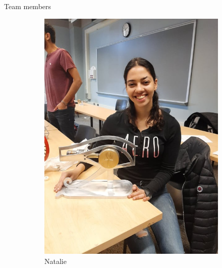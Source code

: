 \begin{frame}{Team members}
\begin{figure}[h!]
\begin{subfigure}[b]{0.22\linewidth}
       \includegraphics[scale=0.135]{figures/Natalie.jpg}
        \caption{Natalie}
        \label{fig:Natalie}
    \end{subfigure}
     \quad
    \begin{subfigure}[b]{0.21\linewidth}

\end{subfigure}
\end{figure}
\end{frame}
